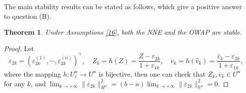 \documentclass[10pt]{article}
\newtheorem{thm}{Theorem}[section]
\begin{document}
The main stability results can be stated as follows, which give a positive answer to question (B).
\begin{thm}\label{47}
Under Assumptions \ref{16},  both the NNE  and the OWAP are stable.
\end{thm}
\begin{proof}
Let
\begin{equation}\label{50}
\varepsilon_{2k}=(\varepsilon^{(1)}_{2k},\cdots,\varepsilon^{(n)}_{2k})^{\top}, \quad Z_k=h(Z)=\frac{Z-\varepsilon_{2k}}{1+\varepsilon_{1k}},\quad \overline{v}_k=h(\widehat{v}_k)=\frac{\widehat{v}_k-\varepsilon_{2k}}{1+\varepsilon_{1k}},
\end{equation}
where the mapping $h:U^n_{\varepsilon}\rightarrow U^n$ is  bijective, then one can check that $Z_k,\overline{v}_k\in U^n$ for any $k$, and
$\lim_{k\rightarrow+\infty}\|\varepsilon_{2k}\|_{H^n}^2=(b-a)\lim_{k\rightarrow+\infty}\|\varepsilon_{2k}\|_{\mathbb{R}^n}^2=0.$


\end{proof}
\end{document}

